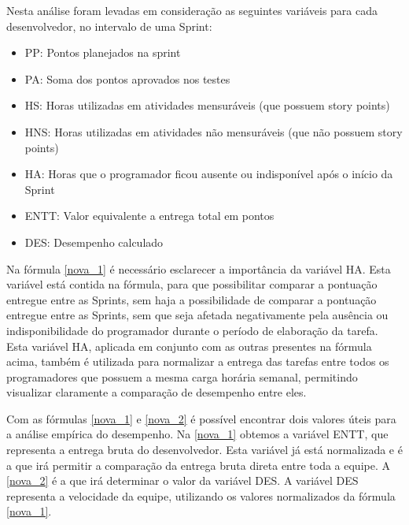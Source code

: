 \bigskip

Nesta análise foram levadas em consideração as seguintes variáveis para cada desenvolvedor, no intervalo de uma Sprint:

\begin{itemize}
    \item PP: Pontos planejados na sprint
    \item PA: Soma dos pontos aprovados nos testes
    \item HS: Horas utilizadas em atividades mensuráveis (que possuem story points)
    \item HNS: Horas utilizadas em atividades não mensuráveis (que não possuem story points)
    \item HA: Horas que o programador ficou ausente ou indisponível após o início da Sprint
    \item ENTT: Valor equivalente a entrega total em pontos
    \item DES: Desempenho calculado
\end{itemize}

Na fórmula \ref{nova_1} é necessário esclarecer a importância da variável HA. Esta variável está contida na fórmula, para que possibilitar comparar a pontuação entregue entre as Sprints, sem haja a possibilidade de comparar a pontuação entregue entre as Sprints, sem que seja afetada negativamente pela ausência ou indisponibilidade do programador durante o período de elaboração da tarefa. Esta variável HA, aplicada em conjunto com as outras presentes na fórmula acima, também é utilizada para normalizar a entrega das tarefas entre todos os programadores que possuem a mesma carga horária semanal, permitindo visualizar claramente a comparação de desempenho entre eles.\par

Com as fórmulas \ref{nova_1} e \ref{nova_2} é possível encontrar dois valores úteis para a análise empírica do desempenho. Na \ref{nova_1} obtemos a variável ENTT, que representa a entrega bruta do desenvolvedor. Esta variável já está normalizada e é a que irá permitir a comparação da entrega bruta direta entre toda a equipe. A \ref{nova_2} é a que irá determinar o valor da variável DES. A variável DES representa a velocidade da equipe, utilizando os valores normalizados da fórmula \ref{nova_1}.